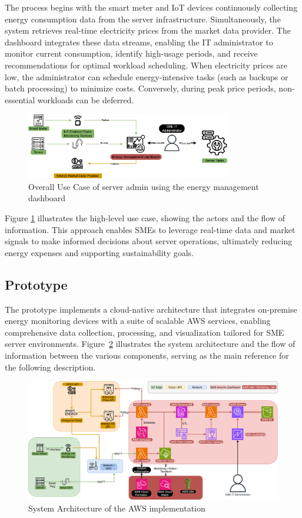 The process begins with the smart meter and IoT devices continuously collecting energy consumption data from the server infrastructure. Simultaneously, the system retrieves real-time electricity prices from the market data provider. The dashboard integrates these data streams, enabling the IT administrator to monitor current consumption, identify high-usage periods, and receive recommendations for optimal workload scheduling. When electricity prices are low, the administrator can schedule energy-intensive tasks (such as backups or batch processing) to minimize costs. Conversely, during peak price periods, non-essential workloads can be deferred. 
\begin{figure}[htbp]
    \centering
    \includegraphics[width=0.8\textwidth]{fig/high_level_use_case.png}
    \caption{Overall Use Case of server admin using the energy management dashboard}
    \label{fig:highleveluse}
\end{figure}
Figure \ref{fig:highleveluse} illustrates the high-level use case, showing the actors and the flow of information. This approach enables SMEs to leverage real-time data and market signals to make informed decisions about server operations, ultimately reducing energy expenses and supporting sustainability goals.

\subsection{Prototype}
The prototype implements a cloud-native architecture that integrates on-premise energy monitoring devices with a suite of scalable AWS services, enabling comprehensive data collection, processing, and visualization tailored for SME server environments. Figure~\ref{fig:architecture} illustrates the system architecture and the flow of information between the various components, serving as the main reference for the following description.

\begin{figure}[htbp]
    \centering
    \includegraphics[width=1.2\textwidth]{fig/architektur_new_2.png}
    \caption{System Architecture of the AWS implementation}
    \label{fig:architecture}
\end{figure}

